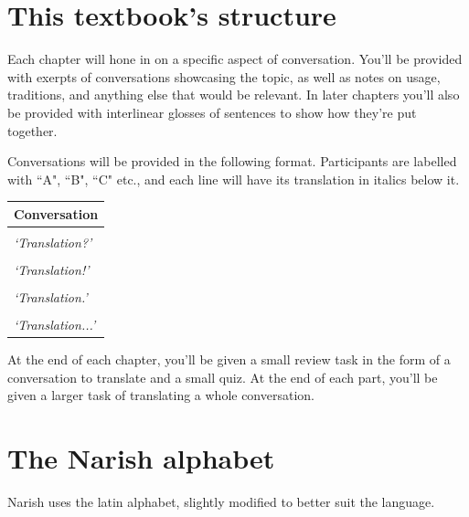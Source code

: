 \documentclass[a5paper,10pt,twoside,openright]{memoir}
\renewcommand{\arraystretch}{1.4}
\newcommand\famword[1]{{\addfontfeatures{Letters=UppercaseSmallCaps}#1}}
\newcommand{\convowidth}{0.862\textwidth}
\newenvironment{conversation}
    {\renewcommand{\arraystretch}{0.75}
    \begin{table}[ht]
        \centering
        \begin{tabular}{p{\convowidth}}
        \toprule
        \textbf{Conversation} \\
        \midrule
    }
    { 
        \bottomrule
        \end{tabular}
    \end{table}
    \renewcommand{\arraystretch}{1.4}
    }
\newcommand{\diagline}[3]{\hspace{1em} 

\begin{minipage}[c][1cm][t]{\convowidth}
    \textbf{\uppercase{#1:}} \famword{#2} \\
    \textit{`#3'}
\end{minipage} \\}
\begin{document}
\chapter{This textbook's structure}

Each chapter will hone in on a specific aspect of conversation. You'll be provided with exerpts of conversations showcasing the topic, as well as notes on usage, traditions, and anything else that would be relevant. In later chapters you'll also be provided with interlinear glosses of sentences to show how they're put together. 

Conversations will be provided in the following format. Participants are labelled with ``A", ``B", ``C" etc., and each line will have its translation in italics below it.

\begin{conversation}
    \diagline{a}{Example sentence?}{Translation?}
    \diagline{b}{Example sentence!}{Translation!}
    \diagline{a}{``Example" sentence.}{Translation.}
    \diagline{c}{Example sentence...}{Translation...}
\end{conversation}

At the end of each chapter, you'll be given a small review task in the form of a conversation to translate and a small quiz. At the end of each part, you'll be given a larger task of translating a whole conversation.

\chapter{The Narish alphabet}

Narish uses the latin alphabet, slightly modified to better suit the language.
\end{document}
